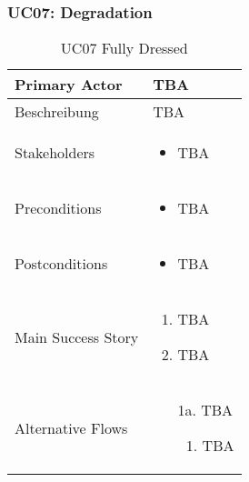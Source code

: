 \subsubsection{UC07: Degradation}
\begin{table}[H]
	\centering
	\begin{tabularx}{\textwidth}{l | X}
		Primary Actor   & TBA       \\
		\hline
		Beschreibung   & TBA  \\ 
		\hline
		Stakeholders       & 
		\begin{itemize}
			\item TBA
		\end{itemize} \\ 
		Preconditions      &
		\begin{itemize}	
			\item TBA
		\end{itemize}  \\
		\hline
		Postconditions     & 
		\begin{itemize}	
			\item TBA
		\end{itemize}  \\
		\hline
		Main Success Story & 
		\begin{enumerate}
			\item TBA
			\item TBA
		\end{enumerate}
		\\
		\hline
		Alternative Flows  & 
		\begin{itemize}
			\item[1a.]  TBA
			\begin{enumerate}
				\item TBA
			\end{enumerate}
		\end{itemize}
	\end{tabularx}
	\caption{UC07 Fully Dressed}
	\label{tab:UC07}
\end{table}

